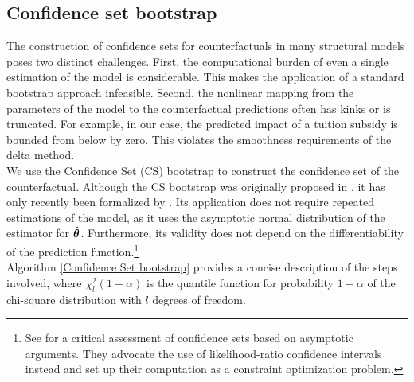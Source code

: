 \subsection{Confidence set bootstrap}
The construction of confidence sets for counterfactuals in many structural models poses two distinct challenges. First, the computational burden of even a single estimation of the model is considerable. This makes the application of a standard bootstrap approach \citep{Efron.1979} infeasible. Second, the nonlinear mapping from the parameters of the model to the counterfactual predictions often has kinks or is truncated. For example, in our case, the predicted impact of a tuition subsidy is bounded from below by zero. This violates the smoothness requirements of the delta method.\\

\noindent We use the Confidence Set (CS) bootstrap to construct the confidence set of the counterfactual. Although the CS bootstrap was originally proposed in \citet{Rao.1973}, it has only recently been formalized by \cite{Woutersen.2019}. Its application does not require repeated estimations of the model, as it uses the asymptotic normal distribution of the estimator for $\hat{\bm{\theta}}$. Furthermore, its validity does not depend on the differentiability of the prediction function.\footnote{See \citet{Reich.2020} for a critical assessment of confidence sets based on asymptotic arguments. They advocate the use of likelihood-ratio confidence intervals instead and set up their computation as a constraint optimization problem.}\\

\noindent Algorithm \ref{Confidence Set bootstrap} provides a concise description of the steps involved, where $\chi_l^2(1 - \alpha)$ is the quantile function for probability $1 - \alpha$ of the chi-square distribution with $l$ degrees of freedom.\\

